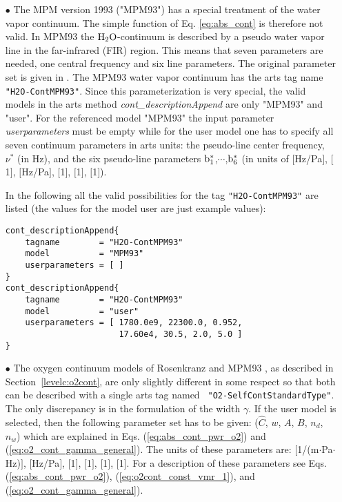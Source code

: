 \begin{itemize}
\item[$\bullet$] The MPM version 1993 ("MPM93") \citep{liebeetal:93} 
has a special treatment of the water vapor continuum. The simple 
function of Eq. \ref{eq:abs_cont} is therefore not valid. In MPM93 
the $\mbox{H}_2\mbox{O}$-continuum is described by a pseudo water vapor line in the 
far-infrared (FIR) region. This means that seven parameters are 
needed, one central frequency and six line parameters. The original 
parameter set is given in \citet{liebeetal:93}. The MPM93 water vapor 
continuum has the arts tag name {\tt "H2O-ContMPM93"}. Since this 
parameterization is very special, the valid models 
in the arts method {\it cont\_descriptionAppend} are only 
"MPM93" and "user". For the referenced model "MPM93" the 
input parameter {\it userparameters} must be empty while 
for the user model one has to specify all seven continuum 
parameters in arts units: the pseudo-line center frequency, 
$\nu^*$ (in Hz), and the six pseudo-line parameters $\rm b^*_{\rm 1}$,$\cdots$,$\rm b^*_{\rm 6}$ 
(in units of $[$Hz/Pa$]$, $[$1$]$, $[$Hz/Pa$]$, $[$1$]$, $[$1$]$, $[$1$]$).

In the following all the valid possibilities for the
tag {\tt "H2O-ContMPM93"} are listed (the values for the 
model user are just example values):
\begin{lstlisting}
cont_descriptionAppend{
    tagname        = "H2O-ContMPM93"
    model          = "MPM93"
    userparameters = [ ]
}
cont_descriptionAppend{
    tagname        = "H2O-ContMPM93"
    model          = "user"
    userparameters = [ 1780.0e9, 22300.0, 0.952, 
                       17.60e4, 30.5, 2.0, 5.0 ]
}
\end{lstlisting}


\item[$\bullet$] The oxygen continuum models of Rosenkranz
  \citep{pwr:93} and MPM93 \citep{liebeetal:93}, as described in
  Section~\ref{levelc:o2cont}, are only slightly dif\-ferent in some
  respect so that
  both can be described with a single arts tag named {\tt
    "O2-SelfContStandardType"}. The only discrepancy is in the
  formulation of the width $\gamma$. If the user model is selected,
  then the following parameter set has to be given: ($\widehat{C}$,
  $w$, $A$, $B$, $n_d$, $n_w$) which are explained in Eqs.
  (\ref{eq:abs_cont_pwr_o2}) and (\ref{eq:o2_cont_gamma_general}).
  The units of these parameters are: $[$1/(m$\cdot$Pa$\cdot$Hz)$]$,
  $[$Hz/Pa$]$, $[$1$]$, $[$1$]$, $[$1$]$, $[$1$]$. For a description
  of these parameters see Eqs. (\ref{eq:abs_cont_pwr_o2}),
  (\ref{eq:o2cont_const_vmr_1}), and (\ref{eq:o2_cont_gamma_general}).
  

\end{itemize}
